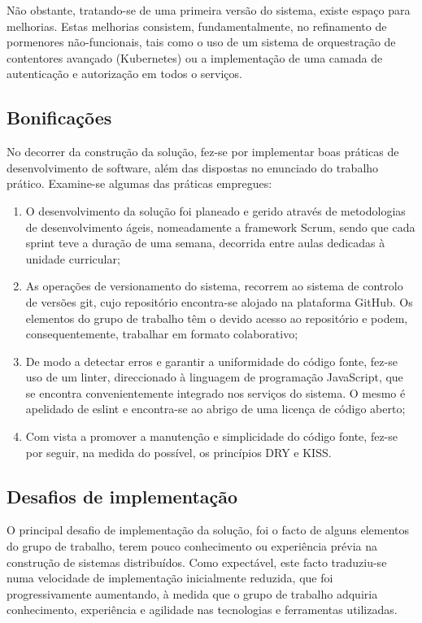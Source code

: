 Não obstante, tratando-se de uma primeira versão do sistema, existe espaço para melhorias. Estas melhorias consistem, fundamentalmente, no refinamento de pormenores não-funcionais, tais como o uso de um sistema de orquestração de contentores avançado (Kubernetes) ou a implementação de uma camada de autenticação e autorização em todos o serviços.

\subsection{Bonificações}

No decorrer da construção da solução, fez-se por implementar boas práticas de desenvolvimento de software, além das dispostas no enunciado do trabalho prático. Examine-se algumas das práticas empregues:

\begin{enumerate}
    \item O desenvolvimento da solução foi planeado e gerido através de metodologias de desenvolvimento ágeis, nomeadamente a framework Scrum, sendo que cada sprint teve a duração de uma semana, decorrida entre aulas dedicadas à unidade curricular;
    
    \item As operações de versionamento do sistema, recorrem ao sistema de controlo de versões git, cujo repositório encontra-se alojado na plataforma GitHub. Os elementos do grupo de trabalho têm o devido acesso ao repositório e podem, consequentemente, trabalhar em formato colaborativo;
    
    \item De modo a detectar erros e garantir a uniformidade do código fonte, fez-se uso de um linter, direccionado à linguagem de programação JavaScript, que se encontra convenientemente integrado nos serviços do sistema. O mesmo é apelidado de eslint e encontra-se ao abrigo de uma licença de código aberto;
    
    \item Com vista a promover a manutenção e simplicidade do código fonte, fez-se por seguir, na medida do possível, os princípios DRY e KISS.
\end{enumerate}

\subsection{Desafios de implementação}

O principal desafio de implementação da solução, foi o facto de alguns elementos do grupo de trabalho, terem pouco conhecimento ou experiência prévia na construção de sistemas distribuídos. Como expectável, este facto traduziu-se numa velocidade de implementação inicialmente reduzida, que foi progressivamente aumentando, à medida que o grupo de trabalho adquiria conhecimento, experiência e agilidade nas tecnologias e ferramentas utilizadas.